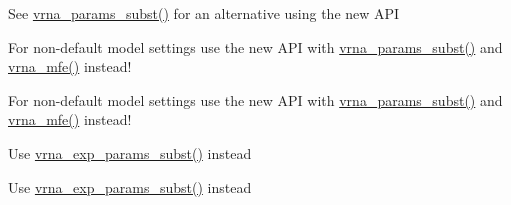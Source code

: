 \begin{DoxyRefList}
\item[\label{deprecated__deprecated000034}%
\hypertarget{deprecated__deprecated000034}{}%
Global \hyperlink{group__mfe__cofold_gaaadbd28b4e428710529ab4098fdacad3}{update\+\_\+cofold\+\_\+params\+\_\+par} (vrna\+\_\+param\+\_\+t $\ast$parameters)]See \hyperlink{group__energy__parameters_ga5d1909208f7ea3baa98b75afaa1f62ca}{vrna\+\_\+params\+\_\+subst()} for an alternative using the new A\+P\+I  
\item[\label{deprecated__deprecated000067}%
\hypertarget{deprecated__deprecated000067}{}%
Global \hyperlink{group__mfe__fold__single_ga41bf8f6fa15b94471f7095cad9f0ccf3}{update\+\_\+fold\+\_\+params} (void)]For non-\/default model settings use the new A\+P\+I with \hyperlink{group__energy__parameters_ga5d1909208f7ea3baa98b75afaa1f62ca}{vrna\+\_\+params\+\_\+subst()} and \hyperlink{group__mfe__fold_gabd3b147371ccf25c577f88bbbaf159fd}{vrna\+\_\+mfe()} instead! 
\item[\label{deprecated__deprecated000068}%
\hypertarget{deprecated__deprecated000068}{}%
Global \hyperlink{group__mfe__fold__single_gae66dc422efb8f5d56717d92d6002a9f8}{update\+\_\+fold\+\_\+params\+\_\+par} (vrna\+\_\+param\+\_\+t $\ast$parameters)]For non-\/default model settings use the new A\+P\+I with \hyperlink{group__energy__parameters_ga5d1909208f7ea3baa98b75afaa1f62ca}{vrna\+\_\+params\+\_\+subst()} and \hyperlink{group__mfe__fold_gabd3b147371ccf25c577f88bbbaf159fd}{vrna\+\_\+mfe()} instead! 
\item[\label{deprecated__deprecated000098}%
\hypertarget{deprecated__deprecated000098}{}%
Global \hyperlink{group__pf__fold_ga384e927890f9c034ff09fa66da102d28}{update\+\_\+pf\+\_\+params} (int length)]Use \hyperlink{group__energy__parameters_ga8e7ac4fab3b0cc03afbc134eaafb3525}{vrna\+\_\+exp\+\_\+params\+\_\+subst()} instead


\item[\label{deprecated__deprecated000099}%
\hypertarget{deprecated__deprecated000099}{}%
Global \hyperlink{group__pf__fold_gaafe2d1b21f5418b123b088aa395e827d}{update\+\_\+pf\+\_\+params\+\_\+par} (int length, vrna\+\_\+exp\+\_\+param\+\_\+t $\ast$parameters)]Use \hyperlink{group__energy__parameters_ga8e7ac4fab3b0cc03afbc134eaafb3525}{vrna\+\_\+exp\+\_\+params\+\_\+subst()} instead



\end{DoxyRefList}
